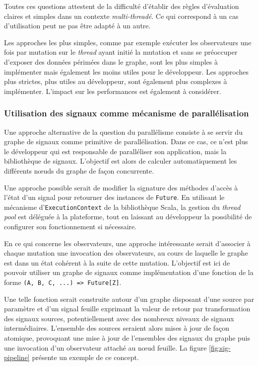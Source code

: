 Toutes ces questions attestent de la difficulté d'établir des règles d'évaluation claires et simples dans un contexte \emph{multi-threadé}. Ce qui correspond à un cas d'utilisation peut ne pas être adapté à un autre.

Les approches les plus simples, comme par exemple exécuter les observateurs une fois par mutation sur le \emph{thread} ayant initié la mutation et sans se préoccuper d'exposer des données périmées dans le graphe, sont les plus simples à implémenter mais également les moins utiles pour le développeur. Les approches plus strictes, plus utiles au développeur, sont également plus complexes à implémenter. L'impact sur les performances est également à considérer.

\subsubsection{Utilisation des signaux comme mécanisme de parallélisation}

Une approche alternative de la question du parallélisme consiste à se servir du graphe de signaux comme primitive de parallélisation. Dans ce cas, ce n'est plus le développeur qui est responsable de paralléliser son application, mais la bibliothèque de signaux. L'objectif est alors de calculer automatiquement les différents nœuds du graphe de façon concurrente.

Une approche possible serait de modifier la signature des méthodes d'accès à l'état d'un signal pour retourner des instances de \texttt{Future}. En utilisant le mécanisme d'\texttt{ExecutionContext} de la bibliothèque Scala, la gestion du \emph{thread pool} est déléguée à la plateforme, tout en laissant au développeur la possibilité de configurer son fonctionnement si nécessaire.

En ce qui concerne les observateurs, une approche intéressante serait d'associer à chaque mutation une invocation des observateurs, au cours de laquelle le graphe est dans un état cohérent à la suite de cette mutation. L'objectif est ici de pouvoir utiliser un graphe de signaux comme implémentation d'une fonction de la forme \texttt{(A, B, C, ...) => Future[Z]}.

Une telle fonction serait construite autour d'un graphe disposant d'une source par paramètre et d'un signal feuille exprimant la valeur de retour par transformation des signaux sources, potentiellement avec des nombreux niveaux de signaux intermédiaires. L'ensemble des sources seraient alors mises à jour de façon atomique, provoquant une mise à jour de l'ensembles des signaux du graphe puis une invocation d'un observateur attaché au nœud feuille. La figure \ref{fig:sig-pipeline} présente un exemple de ce concept.

